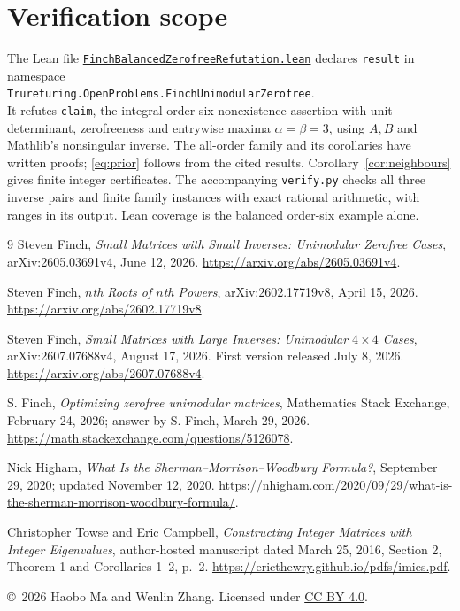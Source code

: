 \documentclass[11pt,a4paper]{article}
\begin{document}
\section{Verification scope}
The Lean file
\href{https://github.com/the-omega-institute/trureturing/blob/3ede1d0bfa6d3c063b82234699d279136b6f0c42/D5/S3/QuadraticForms/FinchBalancedZerofreeRefutation.lean}{\texttt{FinchBalancedZerofreeRefutation.lean}}
declares \texttt{result} in namespace\\
\texttt{Trureturing.OpenProblems.FinchUnimodularZerofree}.\\
It refutes \texttt{claim}, the integral order-six nonexistence assertion
with unit determinant, zerofreeness and entrywise maxima
$\alpha=\beta=3$, using $A,B$ and Mathlib's nonsingular inverse.
The all-order family and its corollaries have written proofs;
\eqref{eq:prior} follows from the cited results.
Corollary~\ref{cor:neighbours} gives finite integer certificates.
The accompanying \texttt{verify.py} checks all three inverse pairs and
finite family instances with exact rational arithmetic, with ranges
in its output. Lean coverage is the balanced order-six example alone.

\begin{thebibliography}{9}
Steven Finch, \emph{Small Matrices with Small Inverses:
Unimodular Zerofree Cases}, arXiv:2605.03691v4, June 12, 2026.
\url{https://arxiv.org/abs/2605.03691v4}.

Steven Finch, \emph{$n$th Roots of $n$th Powers},
arXiv:2602.17719v8, April 15, 2026.
\url{https://arxiv.org/abs/2602.17719v8}.

Steven Finch, \emph{Small Matrices with Large Inverses:
Unimodular $4\times4$ Cases}, arXiv:2607.07688v4, August 17, 2026.
First version released July 8, 2026.
\url{https://arxiv.org/abs/2607.07688v4}.

S. Finch, \emph{Optimizing zerofree unimodular matrices},
Mathematics Stack Exchange, February 24, 2026;
answer by S. Finch, March 29, 2026.
\url{https://math.stackexchange.com/questions/5126078}.

Nick Higham, \emph{What Is the Sherman--Morrison--Woodbury Formula?},
September 29, 2020; updated November 12, 2020.
\url{https://nhigham.com/2020/09/29/what-is-the-sherman-morrison-woodbury-formula/}.

Christopher Towse and Eric Campbell,
\emph{Constructing Integer Matrices with Integer Eigenvalues},
author-hosted manuscript dated March 25, 2016,
Section 2, Theorem 1 and Corollaries 1--2, p.~2.
\url{https://ericthewry.github.io/pdfs/imies.pdf}.
\end{thebibliography}
\smallskip
\noindent\small
\copyright\ 2026 Haobo Ma and Wenlin Zhang.
Licensed under \href{https://creativecommons.org/licenses/by/4.0/}{CC BY 4.0}.
\end{document}
